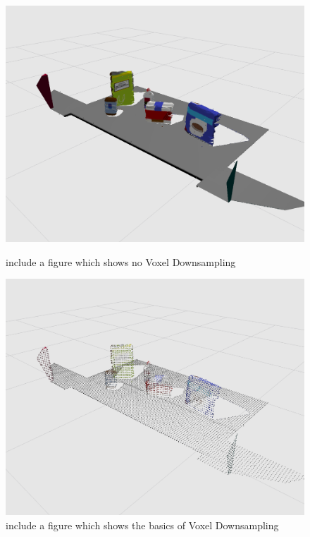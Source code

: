 \documentclass[a4paper]{article}
\begin{document}
\begin{figure}[h]
\centering
\begin{minipage}{0.45\linewidth}
\centering
\includegraphics[scale=0.2]{image5}
\caption{include a figure which shows no Voxel Downsampling}
\end{minipage}
\hspace{0.5cm}
\begin{minipage}{0.45\linewidth}
\centering
\includegraphics[scale=0.2]{image10}
\caption{include a figure which shows the basics of Voxel Downsampling}
\end{minipage}
\end{figure}
\end{document}

